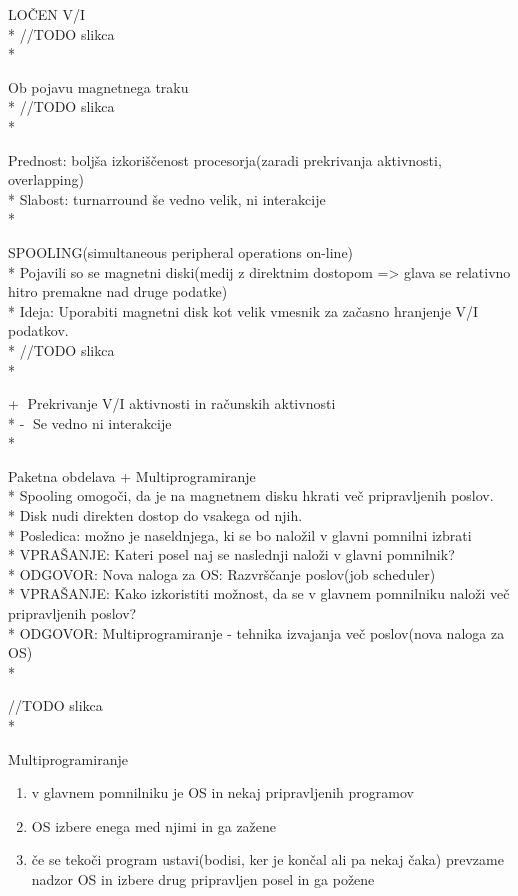 \documentclass[
  slovene,
  a4paper
]{book}
\begin{document}
LOČEN V/I\\*
//TODO slikca\\*

Ob pojavu magnetnega traku\\*
//TODO slikca\\*

Prednost: boljša izkoriščenost procesorja(zaradi prekrivanja aktivnosti, overlapping)\\*
Slabost: turnarround še vedno velik, ni interakcije\\*

SPOOLING(simultaneous peripheral operations on-line)\\*
Pojavili so se magnetni diski(medij z direktnim dostopom => glava se relativno hitro premakne nad druge podatke)\\*
Ideja: Uporabiti magnetni disk kot velik vmesnik za začasno hranjenje V/I podatkov.\\*
//TODO slikca\\*

\textcircled{+} Prekrivanje V/I aktivnosti in računskih aktivnosti\\*
\textcircled{-} Se vedno ni interakcije\\*

Paketna obdelava + Multiprogramiranje\\*
Spooling omogoči, da je na magnetnem disku hkrati več pripravljenih poslov.\\*
Disk nudi direkten dostop do vsakega od njih.\\*
Posledica: možno je naseldnjega, ki se bo naložil v glavni pomnilni izbrati\\*
VPRAŠANJE: Kateri posel naj se naslednji naloži v glavni pomnilnik?\\*
ODGOVOR: Nova naloga za OS: Razvrščanje poslov(job scheduler)\\*
VPRAŠANJE: Kako izkoristiti možnost, da se v glavnem pomnilniku naloži več pripravljenih poslov?\\*
ODGOVOR: Multiprogramiranje - tehnika izvajanja več poslov(nova naloga za OS)\\*

//TODO slikca\\*

Multiprogramiranje
\begin{enumerate}
  \item v glavnem pomnilniku je OS in nekaj pripravljenih programov
  \item OS izbere enega med njimi in ga zažene
  \item če se tekoči program ustavi(bodisi, ker je končal ali pa nekaj čaka) prevzame nadzor OS in izbere drug pripravljen posel in ga požene
\end{enumerate}
\end{document}
